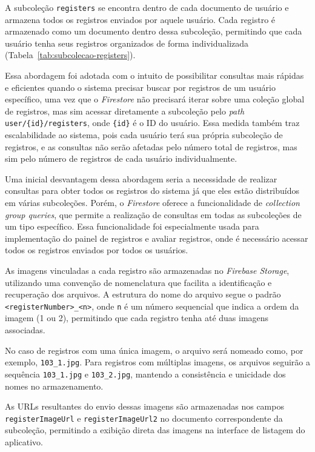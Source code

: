 A subcoleção \texttt{registers} se encontra dentro de cada documento de usuário e armazena todos os registros enviados por aquele usuário. Cada registro é armazenado como um documento dentro dessa subcoleção, permitindo que cada usuário tenha seus registros organizados de forma individualizada (Tabela~\ref{tab:subcolecao-registers}). 

Essa abordagem foi adotada com o intuito de possibilitar consultas mais rápidas e eficientes quando o sistema precisar buscar por registros de um usuário específico, uma vez que o \textit{Firestore} não precisará iterar sobre uma coleção global de registros, mas sim acessar diretamente a subcoleção pelo \textit{path} \texttt{user/\{id\}/registers}, onde \texttt{\{id\}} é o ID do usuário. Essa medida também traz escalabilidade ao sistema, pois cada usuário terá sua própria subcoleção de registros, e as consultas não serão afetadas pelo número total de registros, mas sim pelo número de registros de cada usuário individualmente.

Uma inicial desvantagem dessa abordagem seria a necessidade de realizar consultas para obter todos os registros do sistema já que eles estão distribuídos em várias subcoleções. Porém, o \textit{Firestore} oferece a funcionalidade de \textit{collection group queries}, que permite a realização de consultas em todas as subcoleções de um tipo específico. Essa funcionalidade foi especialmente usada para implementação do painel de registros e avaliar registros, onde é necessário acessar todos os registros enviados por todos os usuários.

As imagens vinculadas a cada registro são armazenadas no \textit{Firebase Storage}, utilizando uma convenção de nomenclatura que facilita a identificação e recuperação dos arquivos. A estrutura do nome do arquivo segue o padrão \texttt{<registerNumber>\_<n>}, onde \texttt{n} é um número sequencial que indica a ordem da imagem (1 ou 2), permitindo que cada registro tenha até duas imagens associadas.

No caso de registros com uma única imagem, o arquivo será nomeado como, por exemplo, \texttt{103\_1.jpg}. Para registros com múltiplas imagens, os arquivos seguirão a sequência \texttt{103\_1.jpg} e \texttt{103\_2.jpg}, mantendo a consistência e unicidade dos nomes no armazenamento.

As URLs resultantes do envio dessas imagens são armazenadas nos campos \texttt{registerImageUrl} e \texttt{registerImageUrl2} no documento correspondente da subcoleção, permitindo a exibição direta das imagens na interface de listagem do aplicativo.

